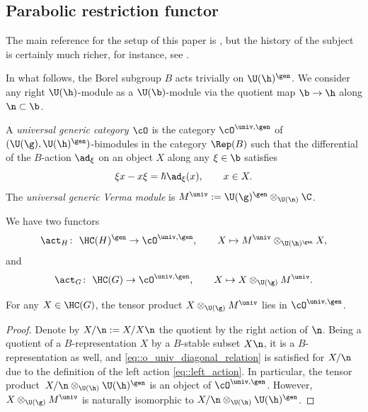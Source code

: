 	\subsection{Parabolic restriction functor}
	\label{subsect::parabolic_reduction}
	
	The main reference for the setup of this paper is \cite{KalmykovSafronov}, but the history of the subject is certainly much richer, for instance, see \cite{EtingofSchiffmann}.
	
	In what follows, the Borel subgroup $B$ acts trivially on $\U(\h)^{\gen}$. We consider any right $\U(\h)$-module as a $\U(\b)$-module via the quotient map $\b \rightarrow \h$ along $\n\subset \b$.
	\begin{Definition}
		A \emph{universal generic category $\cO$} is the category $\cO^{\univ,\gen}$ of $(\U(\g),\U(\h)^{\gen})$-bimodules in the category $\Rep(B)$ such that the differential of the $B$-action $\ad_{\xi}$ on an object $X$ along any $\xi\in \b$ satisfies
		\begin{equation}
			\label{eq::o_univ_diagonal_relation}
			\xi x - x\xi = \hbar \ad_{\xi}(x),\qquad x\in X.
		\end{equation}
		The \emph{universal generic Verma module} is
$
		M^{\univ} := \U(\g)^{\gen} \otimes_{\U(\n)} \C$.
	\end{Definition}
	
	We have two functors
	\begin{equation}
		\label{eq::act_h}
		\act_H \colon \ \HC(H)^{\gen} \rightarrow \cO^{\univ,\gen},\qquad X \mapsto M^{\univ} \otimes_{\U(\h)^{\gen}} X,
	\end{equation}
	and
	\begin{equation}
		\label{eq::act_g}
		\act_G \colon \ \HC(G) \rightarrow \cO^{\univ,\gen}, \qquad X \mapsto X \otimes_{\U(\g)} M^{\univ}.
	\end{equation}
	
	\begin{Proposition}
		For any $X\in \HC(G)$, the tensor product $X \otimes_{\U(\g)} M^{\univ}$ lies in $\cO^{\univ,\gen}$.
		\begin{proof}
			Denote by $X/\n:=X/X\n$ the quotient by the right action of $\n$. Being a quotient of a $B$-representation $X$ by a $B$-stable subset $X\n$, it is a $B$-representation as well, and \eqref{eq::o_univ_diagonal_relation} is satisfied for $X/\n$ due to the definition of the left action \eqref{eq::left_action}. In particular, the tensor product~${X/\n \otimes_{\U(\h)} \U(\h)^{\gen}}$ is an object of $\cO^{\univ,\gen}$. However, $X \otimes_{\U(\g)} M^{\univ}$ is naturally isomorphic to $X/\n \otimes_{\U(\h)} \U(\h)^{\gen} $.
		\end{proof}
	\end{Proposition}
	

